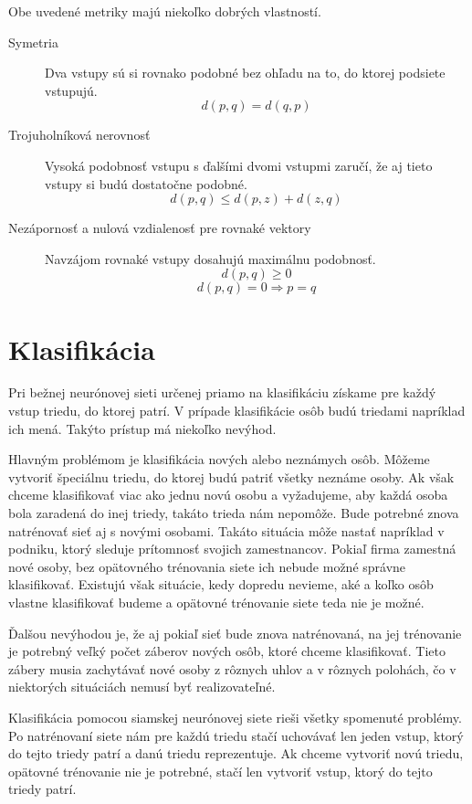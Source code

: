 Obe uvedené metriky majú niekoľko dobrých vlastností.
\begin{description}
\item[Symetria] Dva vstupy sú si rovnako podobné bez ohľadu na to, do ktorej podsiete vstupujú. 
$$d(p, q) = d(q, p) $$
\item[Trojuholníková nerovnosť] Vysoká podobnosť vstupu s ďalšími dvomi vstupmi zaručí, že aj tieto vstupy si budú dostatočne podobné.
$$d(p, q) 	\leq d(p, z) + d(z, q)$$
\item[Nezápornosť a nulová vzdialenosť pre rovnaké vektory] Navzájom rovnaké vstupy dosahujú maximálnu podobnosť.
$$d(p, q) \geq 0$$
$$d(p, q) = 0 \Rightarrow p = q$$
\end{description}

\section{Klasifikácia}
Pri bežnej neurónovej sieti určenej priamo na klasifikáciu získame pre každý vstup triedu, do ktorej patrí.
V prípade klasifikácie osôb budú triedami napríklad ich mená.
Takýto prístup má niekoľko nevýhod.

Hlavným problémom je klasifikácia nových alebo neznámych osôb. 
Môžeme vytvoriť špeciálnu triedu, do ktorej budú patriť všetky neznáme osoby.
Ak však chceme klasifikovať viac ako jednu novú osobu a vyžadujeme, aby každá osoba bola zaradená do inej triedy, takáto trieda nám nepomôže.
Bude potrebné znova natrénovať sieť aj s novými osobami.
Takáto situácia môže nastať napríklad v podniku, ktorý sleduje prítomnosť svojich zamestnancov.
Pokiaľ firma zamestná nové osoby, bez opätovného trénovania siete ich nebude možné správne klasifikovať.
Existujú však situácie, kedy dopredu nevieme, aké a koľko osôb vlastne klasifikovať budeme a opätovné trénovanie siete teda nie je možné.

Ďalšou nevýhodou je, že aj pokiaľ sieť bude znova natrénovaná, na jej trénovanie je potrebný veľký počet záberov nových osôb, ktoré chceme klasifikovať.
Tieto zábery musia zachytávať nové osoby z rôznych uhlov a v rôznych polohách, čo v niektorých situáciách nemusí byť realizovateľné.

Klasifikácia pomocou siamskej neurónovej siete rieši všetky spomenuté problémy.
Po natrénovaní siete nám pre každú triedu stačí uchovávať len jeden vstup, ktorý do tejto triedy patrí a danú triedu reprezentuje.
Ak chceme vytvoriť novú triedu, opätovné trénovanie nie je potrebné, stačí len vytvoriť vstup, ktorý do tejto triedy patrí.

